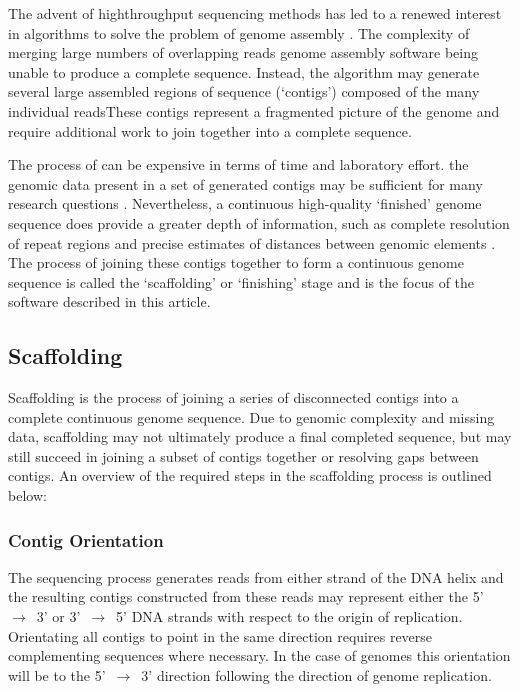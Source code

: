 \documentclass[10pt]{bmc_article}
\newenvironment{bmcformat}{\begin{raggedright}\baselineskip20pt\sloppy\setboolean{publ}{false}}{\end{raggedright}\baselineskip20pt\sloppy}
\begin{document}
\begin{bmcformat}
The advent of high\add{-}throughput sequencing methods has led to a renewed
interest in algorithms to solve the problem of genome assembly
\cite{pop2008,pop2009}. The complexity of merging
large numbers of overlapping reads  genome assembly software
 being unable to produce a complete sequence. Instead, the
algorithm may generate several large assembled regions of sequence (`contigs')
composed of the many individual readsThese contigs
represent a fragmented picture of the genome and  require
additional work to join together into a complete sequence. \pb

The process of  can be expensive in terms of time and
laboratory effort.  the genomic data present in
a set of generated contigs may be sufficient for many research questions
\cite{branscomb2002}. Nevertheless, a continuous high-quality `finished' genome
sequence does provide a greater depth of information, such as complete
resolution of repeat regions and precise estimates of distances between genomic
elements \cite{parkhill2002,fraser2002}. The process of joining these contigs
together to form a continuous genome sequence is called the `scaffolding' or
`finishing' stage and is the focus of the software described in this article.
\pb

\subsection*{Scaffolding} %

Scaffolding is the process of joining a series of disconnected contigs into
a complete continuous genome sequence. Due to genomic complexity and missing
data, scaffolding may not ultimately produce a final completed sequence, but
may still succeed in joining a subset of contigs together or resolving gaps
between contigs. An overview of the required steps in the scaffolding process
is outlined below:

\subsubsection*{Contig Orientation} %

The sequencing process generates reads from either strand of the DNA helix and
the resulting contigs constructed from these reads may represent either the
5'~$\rightarrow$~3' or 3'~$\rightarrow$~5' DNA strands with respect to the
origin of replication. Orientating all contigs to point in the same direction
requires reverse complementing sequences where necessary. In the case of
 genomes this orientation will be to
the 5'~$\rightarrow$~3' direction following the direction of genome
replication.


\end{bmcformat}
\end{document}
